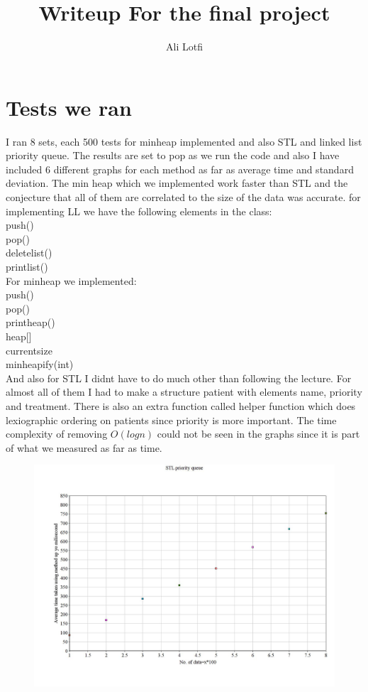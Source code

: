 \documentclass[11pt]{article} %
\title{Writeup For the final project}
\author{Ali Lotfi}
\begin{document}
\maketitle

\section{Tests we ran}
I ran 8 sets, each 500 tests for minheap implemented and also STL and linked list priority queue.
The results are set to pop as we run the code and also I have included 6 different graphs for each method as far as average time and standard deviation.
The min heap which we implemented work faster than STL and the conjecture that all of them are correlated to the size of the data was accurate.
for implementing LL we have the following elements in the class:\\
push()\\
pop()\\
deletelist()\\
printlist()\\
For minheap we implemented:\\
push()\\
pop()\\
printheap()\\
heap[]\\
currentsize\\
minheapify(int)\\
And also for STL I didnt have to do much other than following the lecture.
For almost all of them I had to make a structure patient with elements name, priority and treatment. There is also an extra function called helper function which does lexiographic ordering on patients since priority is more important.
The time complexity of removing $O(logn)$ could not be seen in the graphs since it is part of what we measured as far as time. 
\begin{figure}[ht!]
\centering
\includegraphics[width=120mm]{1.jpg}

\end{figure}
\end{document}
